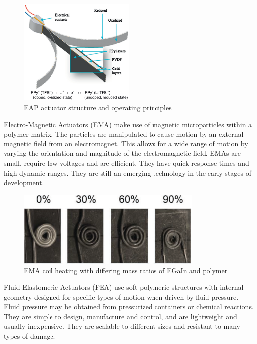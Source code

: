 \begin{figure}[H]
	\centering
	\includegraphics[width=0.5\textwidth]{EAP.png}
	\caption{EAP actuator structure and operating principles \citep{Mutlu2014}}
	\label{fig:eap}
\end{figure}

Electro-Magnetic Actuators (EMA) make use of magnetic microparticles within a polymer matrix. The particles are manipulated to cause motion by an external magnetic field from an electromagnet. This allows for a wide range of motion by varying the orientation and magnitude of the electromagnetic field. EMAs are small, require low voltages and are efficient. They have quick response times and high dynamic ranges. They are still an emerging technology in the early stages of development. \citep{Do2018}

\begin{figure}[H]
	\centering
	\includegraphics[width=0.8\textwidth]{EMA.png}
	\caption{EMA coil heating with differing mass ratios of EGaIn and polymer \citep{Do2018}}
	\label{fig:ema}
\end{figure}

Fluid Elastomeric Actuators (FEA) use soft polymeric structures with internal geometry designed for specific types of motion when driven by fluid pressure. Fluid pressure may be obtained from pressurized containers or chemical reactions. They are simple to design, manufacture and control, and are lightweight and usually inexpensive. They are scalable to different sizes and resistant to many types of damage. \citep{Shepherd2011, Onal2017}


